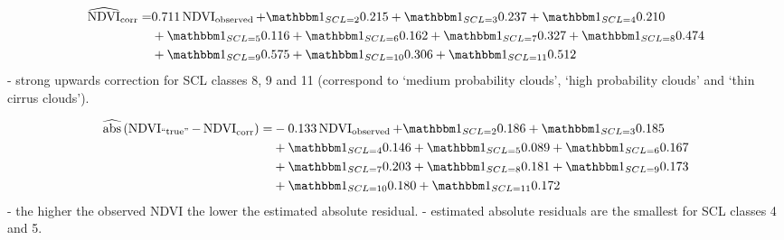 \begin{equation}\label{eq:corr_lm}
	\begin{aligned}		
		\widehat{\operatorname{NDVI}}_{\text{corr}}  = &
		0.711 \operatorname{NDVI}_\text{observed}  
		+ \mathbbm 1_{{SCL = 2}} 0.215 
		+ \mathbbm 1_{{SCL = 3}} 0.237 
		+ \mathbbm 1_{{SCL = 4}} 0.210 \\ &
		+ \mathbbm 1_{{SCL = 5}} 0.116 
		+ \mathbbm 1_{{SCL = 6}} 0.162 
		+ \mathbbm 1_{{SCL = 7}} 0.327 
		+ \mathbbm 1_{{SCL = 8}} 0.474 \\ &
		+ \mathbbm 1_{{SCL = 9}} 0.575 
		+ \mathbbm 1_{{SCL = 10}} 0.306 
		+ \mathbbm 1_{{SCL = 11}} 0.512 
	\end{aligned}
\end{equation}
- strong upwards correction for SCL classes 8, 9 and 11 (correspond to `medium probability clouds', `high probability clouds' and `thin cirrus clouds').

\begin{equation}\label{eq:corr_lm_res}
	\begin{aligned}		
		\widehat{\operatorname{abs}}\left({\operatorname{NDVI}_\text{``true''} - \operatorname{NDVI}}_{\text{corr}}\right)  = &
		-0.133 \operatorname{NDVI}_\text{observed}  
		+ \mathbbm 1_{{SCL = 2}} 0.186 
		+ \mathbbm 1_{{SCL = 3}} 0.185 \\ &
		+ \mathbbm 1_{{SCL = 4}} 0.146 
		+ \mathbbm 1_{{SCL = 5}} 0.089 
		+ \mathbbm 1_{{SCL = 6}} 0.167 \\ &
		+ \mathbbm 1_{{SCL = 7}} 0.203 
		+ \mathbbm 1_{{SCL = 8}} 0.181  
		+ \mathbbm 1_{{SCL = 9}} 0.173 \\ &
		+ \mathbbm 1_{{SCL = 10}} 0.180 
		+ \mathbbm 1_{{SCL = 11}} 0.172 
	\end{aligned}
\end{equation}
- the higher the observed NDVI the lower the estimated absolute residual.
- estimated absolute residuals are the smallest for SCL classes 4 and 5.  
